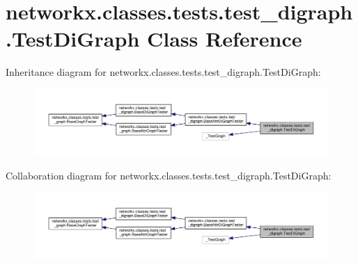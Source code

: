 \hypertarget{classnetworkx_1_1classes_1_1tests_1_1test__digraph_1_1TestDiGraph}{}\section{networkx.\+classes.\+tests.\+test\+\_\+digraph.\+Test\+Di\+Graph Class Reference}
\label{classnetworkx_1_1classes_1_1tests_1_1test__digraph_1_1TestDiGraph}


Inheritance diagram for networkx.\+classes.\+tests.\+test\+\_\+digraph.\+Test\+Di\+Graph\+:
\nopagebreak
\begin{figure}[H]
\begin{center}
\leavevmode
\includegraphics[width=350pt]{classnetworkx_1_1classes_1_1tests_1_1test__digraph_1_1TestDiGraph__inherit__graph}
\end{center}
\end{figure}


Collaboration diagram for networkx.\+classes.\+tests.\+test\+\_\+digraph.\+Test\+Di\+Graph\+:
\nopagebreak
\begin{figure}[H]
\begin{center}
\leavevmode
\includegraphics[width=350pt]{classnetworkx_1_1classes_1_1tests_1_1test__digraph_1_1TestDiGraph__coll__graph}
\end{center}
\end{figure}
